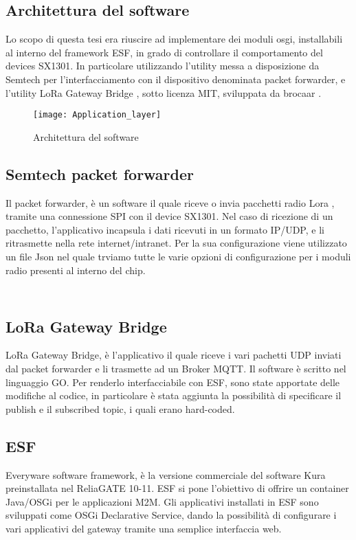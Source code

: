 \subsection{Architettura del software}
Lo scopo di questa tesi era riuscire ad implementare dei moduli osgi,
installabili al interno del framework ESF, in grado di controllare il
comportamento del devices SX1301. In particolare utilizzando l'utility messa a
disposizione da Semtech per l'interfacciamento con il dispositivo denominata
packet forwarder, e l'utility LoRa Gateway Bridge , sotto licenza MIT,
sviluppata da brocaar .

\begin{figure}[h]
\centering 
\texttt{[image: Application\_layer]}
\caption{Architettura del software}
\label{fig:Software_stack}
\end{figure}

\subsection{Semtech packet forwarder}
Il packet forwarder, è un software il quale riceve o invia pacchetti radio Lora ,
tramite una connessione SPI con il device SX1301. Nel caso di ricezione di un
pacchetto, l'applicativo incapsula i dati ricevuti in un formato IP/UDP, e li
ritrasmette nella rete internet/intranet. Per la sua configurazione viene
utilizzato un file Json nel quale trviamo tutte le varie opzioni di
configurazione per i moduli radio presenti al interno del chip.
\inputminted[mathescape, gobble=2, frame=lines, linenos=true
framesep=2mm, firstline=1,lastline=23]{json}{Code_Files/global_json.conf}
\inputminted[mathescape, gobble=2, frame=lines, linenos=true
framesep=2mm, firstline=173,lastline=184]{json}{Code_Files/global_json.conf}

\subsection{LoRa Gateway Bridge}
LoRa Gateway Bridge, è l'applicativo il quale riceve i vari pachetti UDP inviati
dal packet forwarder e li trasmette ad un Broker MQTT. Il software è scritto nel
linguaggio GO. Per renderlo interfacciabile con ESF, sono state apportate delle 
modifiche al codice, in particolare è stata aggiunta la possibilità di
specificare il publish e il subscribed topic, i quali erano hard-coded.

\subsection{ESF}
Everyware software framework, è la versione commerciale del software Kura
preinstallata nel ReliaGATE 10-11. ESF si pone l'obiettivo di offrire un
container Java/OSGi per le applicazioni M2M. Gli applicativi installati in ESF
sono sviluppati come OSGi Declarative Service, dando la possibilità di
configurare i vari applicativi del gateway tramite una semplice interfaccia web.

